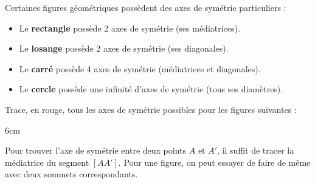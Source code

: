 \documentclass[a4paper]{book}
\begin{document}
    
    \begin{propriete}
        Certaines figures géométriques possèdent des axes de symétrie particuliers :
        \begin{itemize}
            \item Le \textbf{rectangle} possède 2 axes de symétrie (ses médiatrices).
            \item Le \textbf{losange} possède 2 axes de symétrie (ses diagonales).
            \item Le \textbf{carré} possède 4 axes de symétrie (médiatrices et diagonales).
            \item Le \textbf{cercle} possède une infinité d'axes de symétrie (tous ses diamètres).
        \end{itemize}
    \end{propriete}
    
    
    \begin{exemple}
        Trace, en rouge, tous les axes de symétrie possibles pour les figures suivantes :
        \begin{ZoneReponse}{6cm}
        \begin{center}
        \end{center}
        \end{ZoneReponse}
    \end{exemple}
    
    
    \begin{methode}
        Pour trouver l'axe de symétrie entre deux points $A$ et $A'$, il suffit de tracer la médiatrice du segment $[AA']$. Pour une figure, on peut essayer de faire de même avec deux sommets correspondants.
    \end{methode}
\end{document}
